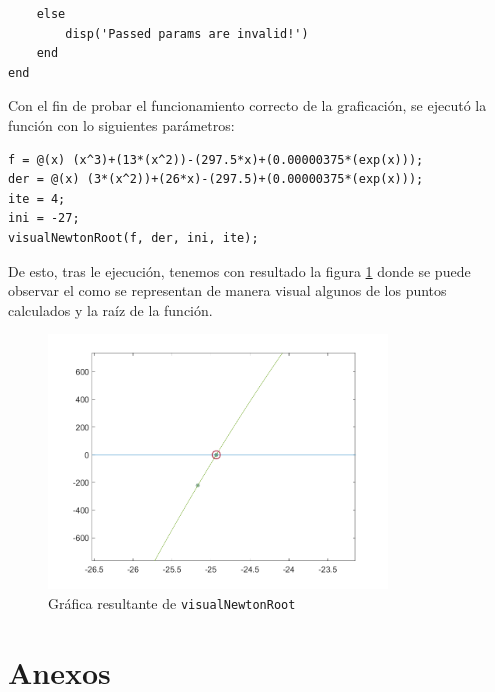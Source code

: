 \documentclass[english,notitlepage,letterpaper, 10pt]{article} %
\begin{document}
\begin{enumerate}
\begin{lstlisting}
    else
        disp('Passed params are invalid!')
    end
end     
    \end{lstlisting}

    Con el fin de probar el funcionamiento correcto de la graficación, se ejecutó la función con lo siguientes parámetros:

\begin{lstlisting}
f = @(x) (x^3)+(13*(x^2))-(297.5*x)+(0.00000375*(exp(x)));
der = @(x) (3*(x^2))+(26*x)-(297.5)+(0.00000375*(exp(x)));
ite = 4;
ini = -27;
visualNewtonRoot(f, der, ini, ite);
\end{lstlisting}

    De esto, tras le ejecución, tenemos con resultado la figura \ref{owo} donde se puede observar el como se representan de manera visual algunos de los puntos calculados y la raíz de la función.

    \begin{figure}[H]
        \centering
        \includegraphics[width=9cm]{Images/coolFig.png}
        \caption{Gráfica resultante de \texttt{visualNewtonRoot}}
        \label{owo}
    \end{figure}

  \end{enumerate}

\newpage
\section{Anexos}
\end{document}
